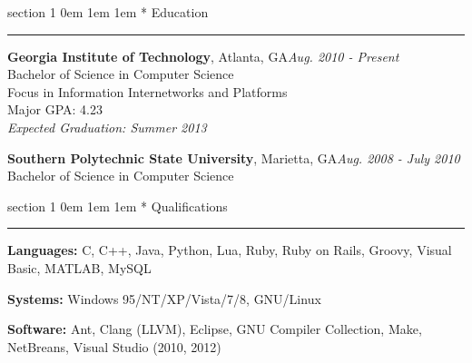 \documentclass{article}
\makeatletter
\newcommand{\name}[1]{\def \@name {#1}}
\newcommand{\streetaddress}[1]{\def \@streetaddress {#1}}
\newcommand{\citystatezip}[1]{\def \@citystatezip {#1}}
\newcommand{\phone}[1]{\def \@phone {#1}}
\newcommand{\email}[1]{\def \@email {#1}}
\newcommand{\website}[1]{\def \@website {#1}}
\renewcommand{\section}[1]{
	\vspace{0.75em} %
	\@startsection
		{section}
		{1}
		{\z@}
		{0em}
		{1em \@minus 1em} %
		{\normalfont\large\sc\bfseries}
		*
		{#1}
	\vspace{-0.75em} %
	\hrule
	\vspace{0.25em} %
	\par
}
\newcommand{\entry}[1]{\def \@entry {#1}}
\newcommand{\dates}[1]{\def \@dates {#1}}
\newcommand{\location}[1]{\def \@location {#1}}
\newenvironment{locationentry}{
		\vspace{0.5em} %
		{\bf \@entry}, \@location \hfill {\it \@dates} \\
	}{}
\makeatother
\begin{document}
\name{Robert Kernan}
\phone{(770) 355-4050}
\streetaddress{16 Arbor Way Drive}
\citystatezip{Decatur, GA 30030}
\email{rkernan@gmail.com}
\website{robertkernan.com}

\maketitle

\thispagestyle{empty}

%
%

%
%
\section{Education}
\entry{Georgia Institute of Technology}
\location{Atlanta, GA}
\dates{Aug. 2010 - Present}
\begin{locationentry}
Bachelor of Science in Computer Science \\
Focus in Information Internetworks and Platforms \\
Major GPA: 4.23 \\
{\it Expected Graduation: Summer 2013}
\par
\end{locationentry}

\entry{Southern Polytechnic State University}
\location{Marietta, GA}
\dates{Aug. 2008 - July 2010}
\begin{locationentry}
Bachelor of Science in Computer Science
\par
\end{locationentry}

%
%
\section{Qualifications}
\vspace{0.5em}
{\bf Languages:}
C, C++, Java, Python, Lua, Ruby, Ruby on Rails, Groovy, Visual Basic, MATLAB, MySQL

\vspace{0.25em}
{\bf Systems:}
Windows 95/NT/XP/Vista/7/8, GNU/Linux

\vspace{0.25em}
{\bf Software:}
Ant, Clang (LLVM), Eclipse, GNU Compiler Collection, Make, NetBreans, Visual Studio (2010, 2012)
\end{document}
